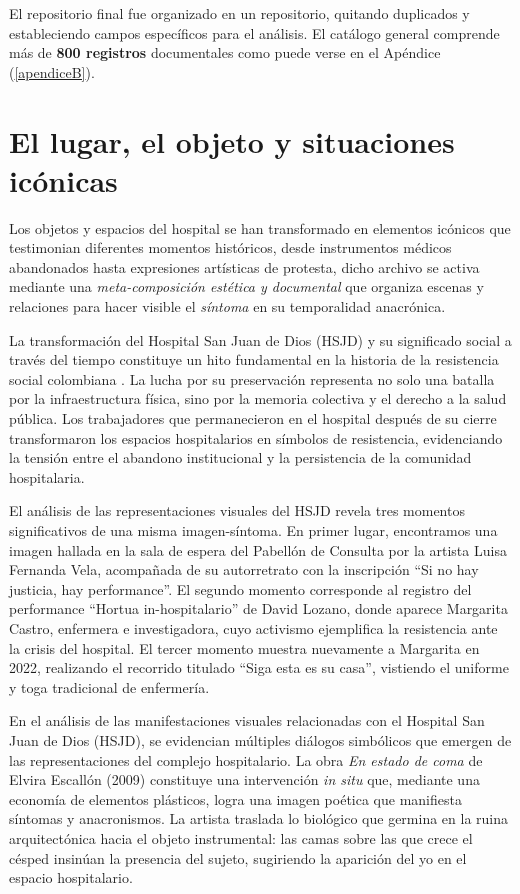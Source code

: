 El repositorio final fue organizado en un repositorio, quitando duplicados y estableciendo campos específicos para el análisis. El catálogo general comprende más de \textbf{800 registros} documentales como puede verse en el Apéndice (\ref{apendiceB}).

\section{El lugar, el objeto y situaciones icónicas}

Los objetos y espacios del hospital se han transformado en elementos icónicos que testimonian diferentes momentos históricos, desde instrumentos médicos abandonados hasta expresiones artísticas de protesta, \textcolor{edit30sept}{dicho archivo se activa mediante una \textit{meta-composición estética y documental} que organiza escenas y relaciones para hacer visible el \textit{síntoma} en su temporalidad anacrónica.}

La transformación del Hospital San Juan de Dios (HSJD) y su significado social a través del tiempo constituye un hito fundamental en la historia de la resistencia social colombiana \parencite{Gongora2013}. La lucha por su preservación representa no solo una batalla por la infraestructura física, sino por la memoria colectiva y el derecho a la salud pública. Los trabajadores que permanecieron en el hospital después de su cierre transformaron los espacios hospitalarios en símbolos de resistencia, evidenciando la tensión entre el abandono institucional y la persistencia de la comunidad hospitalaria.

El análisis de las representaciones visuales del HSJD revela tres momentos significativos de una misma imagen-síntoma. En primer lugar, encontramos una imagen hallada en la sala de espera del Pabellón de Consulta por la artista Luisa Fernanda Vela, acompañada de su autorretrato con la inscripción \enquote{Si no hay justicia, hay performance}. El segundo momento corresponde al registro del performance \enquote{Hortua in-hospitalario} de David Lozano, donde aparece Margarita Castro, enfermera e investigadora, cuyo activismo ejemplifica la resistencia ante la crisis del hospital. El tercer momento muestra nuevamente a Margarita en 2022, realizando el recorrido titulado \enquote{Siga esta es su casa}, vistiendo el uniforme y toga tradicional de enfermería.

En el análisis de las manifestaciones visuales relacionadas con el Hospital San Juan de Dios (HSJD), se evidencian múltiples diálogos simbólicos que emergen de las representaciones del complejo hospitalario. \textcolor{edit30sept}{La obra \textit{En estado de coma} de Elvira Escallón (2009)} constituye una intervención \textit{in situ} que, mediante una economía de elementos plásticos, logra una imagen poética que manifiesta síntomas y anacronismos. La artista traslada lo biológico que germina en la ruina arquitectónica hacia el objeto instrumental: las camas sobre las que crece el césped insinúan la presencia del sujeto, sugiriendo la aparición del yo en el espacio hospitalario.

